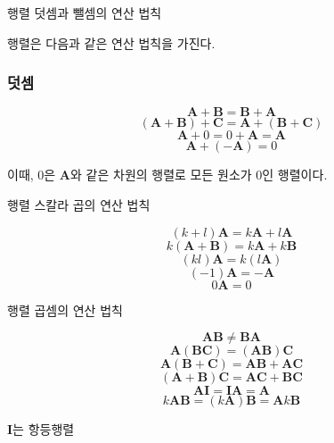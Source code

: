 \begin{frame}{행렬 덧셈과 뺄셈의 연산 법칙}

행렬은 다음과 같은 연산 법칙을 가진다.

\subsubsection{덧셈}

$$\mathbf A + \mathbf B = \mathbf B + \mathbf A$$
$$(\mathbf A + \mathbf B ) + \mathbf C = \mathbf A + ( \mathbf B + \mathbf C ) $$
$$ \mathbf A + 0 = 0 + \mathbf A = \mathbf A$$
$$ \mathbf A + (- \mathbf A ) = 0$$

이때, 0은 $\mathbf A$와 같은 차원의 행렬로 모든 원소가 0인 행렬이다.

\end{frame}


\begin{frame}{행렬 스칼라 곱의 연산 법칙}

$$(k+l) \mathbf A = k \mathbf A + l \mathbf A$$
$$k (\mathbf A + \mathbf B ) = k \mathbf A + k \mathbf B$$
$$(kl) \mathbf A = k (l \mathbf A)$$
$$ (-1) \mathbf A = -\mathbf A$$
$$ 0 \mathbf A = 0$$


\end{frame}

\begin{frame}{행렬 곱셈의 연산 법칙}

$$\mathbf{AB} \neq \mathbf {BA}$$
$$\mathbf{A(BC)} = \mathbf{(AB)C}$$
$$\mathbf{A(B+C)} = \mathbf {AB} + \mathbf {AC}$$
$$\mathbf{(A+B)C} = \mathbf{AC} + \mathbf{BC}$$
$$\mathbf{AI} = \mathbf{IA} = \mathbf A$$
$$k \mathbf{AB} = (k\mathbf A)\mathbf B = \mathbf A k \mathbf B$$

$\mathbf I$는 항등행렬

\end{frame}

